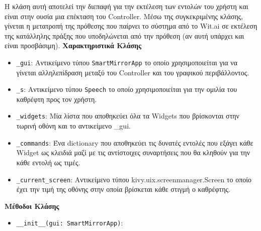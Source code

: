 Η κλάση αυτή αποτελεί την διεπαφή για την εκτέλεση των εντολών του χρήστη και είναι στην ουσία μια επέκταση του Controller. Μέσω της συγκεκριμένης κλάσης, γίνεται η μετατροπή της πρόθεσης που παίρνει το σύστημα από το Wit.ai σε εκτέλεση της κατάλληλης πράξης που υποδηλώνεται από την πρόθεση (αν αυτή υπάρχει και είναι προσβάσιμη).
\newpage
\noindent\textbf{Χαρακτηριστικά Κλάσης}
\begin{itemize}
    \item \texttt{\_gui}: Αντικείμενο τύπου \texttt{SmartMirrorApp} το οποίο χρησιμοποιείται για να γίνεται αλληλεπίδραση μεταξύ του Controller και του γραφικού περιβάλλοντος.
    \item \texttt{\_s}: Αντικείμενο τύπου \texttt{Speech} το οποίο χρησιμοποιείται για την ομιλία του καθρέφτη προς τον χρήστη.
    \item \texttt{\_widgets}: Μία λίστα που αποθηκεύει όλα τα Widgets που βρίσκονται στην τωρινή οθόνη και το αντικείμενο \_gui.
    \item \texttt{\_commands}: Ένα dictionary που αποθηκεύει τις δυνατές εντολές που εξάγει κάθε Widget ως κλειδιά μαζί με τις αντίστοιχες συναρτήσεις που θα κληθούν για την κάθε εντολή ως τιμές.
    \item \texttt{\_current\_screen}: Αντικείμενο τύπου kivy.uix.screenmanager.Screen το οποίο έχει την τιμή της οθόνης στην οποία βρίσκεται κάθε στιγμή ο καθρέφτης.
\end{itemize}
\noindent\textbf{Μέθοδοι Κλάσης}
\begin{itemize}
    \item \texttt{\_\_init\_\_(gui: SmartMirrorApp)}:
\end{itemize}